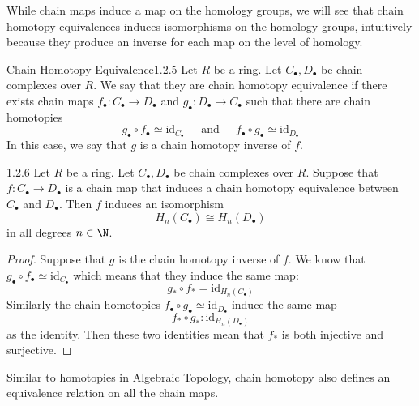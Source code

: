 \documentclass[a4paper]{article}
\begin{document}
While chain maps induce a map on the homology groups, we will see that chain homotopy equivalences induces isomorphisms on the homology groups, intuitively because they produce an inverse for each map on the level of homology. 

\begin{defn}{Chain Homotopy Equivalence}{1.2.5} Let $R$ be a ring. Let $C_\bullet,D_\bullet$ be chain complexes over $R$. We say that they are chain homotopy equivalence if there exists chain maps $f_\bullet:C_\bullet\to D_\bullet$ and $g_\bullet:D_\bullet\to C_\bullet$ such that there are chain homotopies $$g_\bullet\circ f_\bullet\simeq\text{id}_{C_\bullet}\;\;\;\;\text{ and }\;\;\;\;f_\bullet\circ g_\bullet\simeq\text{id}_{D_\bullet}$$ In this case, we say that $g$ is a chain homotopy inverse of $f$. 
\end{defn}

\begin{lmm}{}{1.2.6} Let $R$ be a ring. Let $C_\bullet,D_\bullet$ be chain complexes over $R$. Suppose that $f:C_\bullet\to D_\bullet$ is a chain map that induces a chain homotopy equivalence between $C_\bullet$ and $D_\bullet$. Then $f$ induces an isomorphism $$H_n(C_\bullet)\cong H_n(D_\bullet)$$ in all degrees $n\in\N$. 
\begin{proof}
Suppose that $g$ is the chain homotopy inverse of $f$. We know that $g_\bullet\circ f_\bullet\simeq\text{id}_{C_\bullet}$ which means that they induce the same map: $$g_\ast\circ f_\ast=\text{id}_{H_n(C_\bullet)}$$ Similarly the chain homotopies $f_\bullet\circ g_\bullet\simeq\text{id}_{D_\bullet}$ induce the same map $$f_\ast\circ g_\ast:\text{id}_{H_n(D_\bullet)}$$ as the identity. Then these two identities mean that $f_\ast$ is both injective and surjective. 
\end{proof}
\end{lmm}

Similar to homotopies in Algebraic Topology, chain homotopy also defines an equivalence relation on all the chain maps. 
\end{document}
